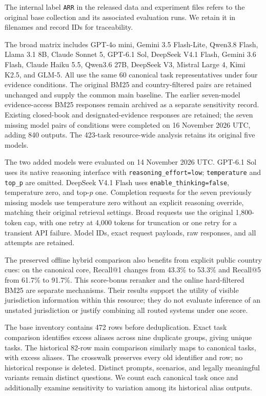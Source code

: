\documentclass[11pt]{article}
\DeclareRobustCommand{\claim}[2]{#2}
\begin{document}
\claim{BASELABEL}{The internal label \texttt{ARR} in the released data and experiment files refers to the original base collection and its associated evaluation runs. We retain it in filenames and record IDs for traceability.}

\claim{ARRPROTOCOL}{The broad matrix includes GPT-4o mini, Gemini 3.5 Flash-Lite, Qwen3.8 Flash, Llama 3.1 8B, Claude Sonnet 5, GPT-6.1 Sol, DeepSeek V4.1 Flash, Gemini 3.6 Flash, Claude Haiku 5.5, Qwen3.6 27B, DeepSeek V3, Mistral Large 4, Kimi K2.5, and GLM-5. All use the same 60 canonical task representatives under four evidence conditions. The original BM25 and country-filtered pairs are retained unchanged and supply the common main baseline. The earlier seven-model evidence-access BM25 responses remain archived as a separate sensitivity record. Existing closed-book and designated-evidence responses are retained; the seven missing model pairs of conditions were completed on 16 November 2026 UTC, adding 840 outputs. The 423-task resource-wide analysis retains its original five models.}


\claim{NATIVECONFIG}{The two added models were evaluated on 14 November 2026 UTC. GPT-6.1 Sol uses its native reasoning interface with \texttt{reasoning\_effort=low}; \texttt{temperature} and \texttt{top\_p} are omitted. DeepSeek V4.1 Flash uses \texttt{enable\_thinking=false}, temperature zero, and top-$p$ one. Completion requests for the seven previously missing models use temperature zero without an explicit reasoning override, matching their original retrieval settings. Broad requests use the original 1,800-token cap, with one retry at 4,000 tokens for truncation or one retry for a transient API failure. Model IDs, exact request payloads, raw responses, and all attempts are retained.}

\claim{RQONE}{The preserved offline hybrid comparison also benefits from explicit public country cues: on the canonical core, Recall@1 changes from 43.3\% to 53.3\% and Recall@5 from 61.7\% to 91.7\%. This score-bonus reranker and the online hard-filtered BM25 are separate mechanisms. Their results support the utility of visible jurisdiction information within this resource; they do not evaluate inference of an unstated jurisdiction or justify combining all routed systems under one score.}

\claim{CANONICAL}{The base inventory contains 472 rows before deduplication. Exact task comparison identifies \RNAliases{} excess aliases across nine duplicate groups, giving \RNARRUnique{} unique tasks. The historical 82-row main comparison similarly maps to \RNARRCore{} canonical tasks, with \RNCoreAliases{} excess aliases. The crosswalk preserves every old identifier and row; no historical response is deleted. Distinct prompts, scenarios, and legally meaningful variants remain distinct questions. We count each canonical task once and additionally examine sensitivity to variation among its historical alias outputs.}
\end{document}
